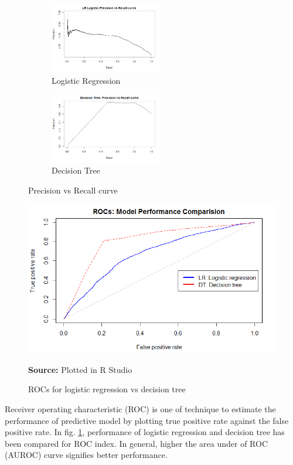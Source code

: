 \begin{figure}[t!]
    \centering
    \begin{subfigure}
        \centering
        \includegraphics[height=1.2in]{LRrecall.png}
        \caption{Logistic Regression}
    \end{subfigure}%
    \begin{subfigure}
        \centering
        \includegraphics[height=1.2in]{DRrecall.png}
        \caption{Decision Tree}
    \end{subfigure}
    \caption{Precision vs Recall curve}
\end{figure}


\begin{center}
\begin{figure}[!htb]
\includegraphics[width=\textwidth]{results1.png}
\centering
\caption{ROCs for logistic regression vs decision tree}{\textbf{Source:} Plotted in R Studio}
\label{fig:roc}
\end{figure}
\end{center}

Receiver operating characteristic (ROC) is one of technique to estimate the performance of predictive model by plotting true positive rate against the false positive rate. In fig. \ref{fig:roc}, performance of logistic regression and decision tree has been compared for ROC index. In general, higher the area under of ROC (AUROC) curve signifies better performance. 

